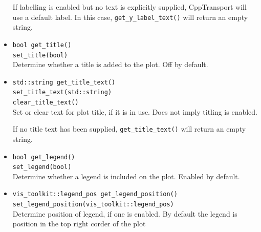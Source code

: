 \documentclass[11pt,a4paper]{article}
\newcommand{\packagefont}{\sffamily}
\newcommand{\CppTransport}{{\packagefont CppTransport}}
\begin{document}
\begin{itemize}
    If labelling is enabled but no text is explicitly supplied, {\CppTransport}
    will use a default label.
    In this case, \texttt{get_y_label_text()} will return an empty string.
    
    \item \texttt{bool get_title()} \\
    \texttt{set_title(bool)} \\
    Determine whether a title is added to the plot. Off by default.
    
    \item \texttt{std::string get_title_text()} \\
    \texttt{set_title_text(std::string)} \\
    \texttt{clear_title_text()} \\
    Set or clear
    text for plot title, if it is in use. Does not imply titling is enabled.
    
    If no title text has been supplied,
    \texttt{get_title_text()} will return an empty string.
    
    \item \texttt{bool get_legend()} \\
    \texttt{set_legend(bool)} \\
    Determine whether a legend is included on the plot. Enabled by default.
    
    \item \texttt{vis_toolkit::legend_pos get_legend_position()} \\
    \texttt{set_legend_position(vis_toolkit::legend_pos)} \\
    Determine position of legend, if one is enabled. By default the legend is
    position in the top right corder of the plot
    

\end{itemize}
\end{document}
